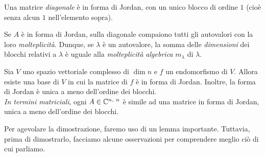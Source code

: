 \begin{observe}
	Una matrice \textit{diagonale} è in forma di Jordan, con un unico blocco di ordine $1$ (cioè senza alcun $1$ nell'elemento sopra).
\end{observe}
\begin{observe}
	Se $A$ è in forma di Jordan, sulla diagonale compaiono tutti gli autovalori con la loro \textit{molteplicità}. Dunque, se $\lambda$ è un autovalore, la somma delle \textit{dimensioni} dei blocchi relativi a $\lambda$ è uguale alla \textit{molteplicità algebrica} $m_\lambda$ di $\lambda$.
\end{observe}
\begin{theorema}
	Sia $V$ uno spazio vettoriale complesso di $\dim n$ e $f$ un endomorfismo di $V$. Allora esiste una base di $V$ in cui la matrice di $f$ è in forma di Jordan. Inoltre, la forma di Jordan è unica a meno dell'ordine dei blocchi.\\
	\textit{In termini matriciali}, ogni $A\in\mathbb{C}^{n,\ n}$ è simile ad una matrice in forma di Jordan, unica a meno dell'ordine dei blocchi.
\end{theorema}
Per agevolare la dimostrazione, faremo uso di un lemma importante. Tuttavia, prima di dimostrarlo, facciamo alcune osservazioni per comprendere meglio ciò di cui parliamo.